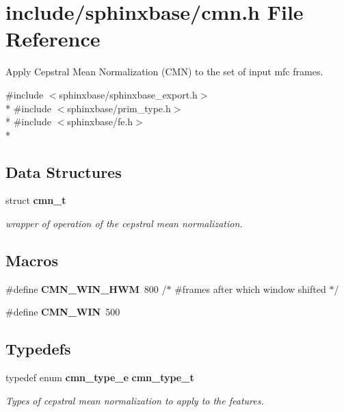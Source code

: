 \section{include/sphinxbase/cmn.h File Reference}
\label{cmn_8h}


Apply Cepstral Mean Normalization (C\-M\-N) to the set of input mfc frames.  


{\ttfamily \#include $<$sphinxbase/sphinxbase\-\_\-export.\-h$>$}\\*
{\ttfamily \#include $<$sphinxbase/prim\-\_\-type.\-h$>$}\\*
{\ttfamily \#include $<$sphinxbase/fe.\-h$>$}\\*
\subsection*{Data Structures}
\begin{DoxyCompactItemize}
\item 
struct {\bf cmn\-\_\-t}
\begin{DoxyCompactList}\small\item\em wrapper of operation of the cepstral mean normalization. \end{DoxyCompactList}\end{DoxyCompactItemize}
\subsection*{Macros}
\begin{DoxyCompactItemize}
\item 
\#define {\bfseries C\-M\-N\-\_\-\-W\-I\-N\-\_\-\-H\-W\-M}~800     /$\ast$ \#frames after which window shifted $\ast$/\label{cmn_8h_abbf37b74032c295136b4b299ecfcedae}

\item 
\#define {\bfseries C\-M\-N\-\_\-\-W\-I\-N}~500\label{cmn_8h_a500dafed8351d334da9290ec4f3f6ab3}

\end{DoxyCompactItemize}
\subsection*{Typedefs}
\begin{DoxyCompactItemize}
\item 
typedef enum {\bf cmn\-\_\-type\-\_\-e} {\bf cmn\-\_\-type\-\_\-t}\label{cmn_8h_a9384c411b10e9db9745cfb550a5c7652}

\begin{DoxyCompactList}\small\item\em Types of cepstral mean normalization to apply to the features. \end{DoxyCompactList}\end{DoxyCompactItemize}
